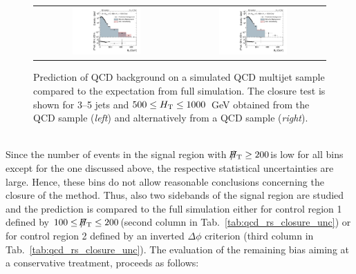 \begin{figure}[!t]
  \centering
  \begin{tabular}{cc}
                \includegraphics[width=0.49\textwidth]{figures/MHT_JetBin2_HTlow_madgraph_DR53X_chs_TuneZ2star_pt10_withoutPUReweighting_UseRebCorrection_v1.pdf} &
                \includegraphics[width=0.49\textwidth]{figures/MHT_JetBin2_HTlow_pythia_DR53X_chs_TuneZ2star_pt10_withoutPUReweighting_UseRebCorrection_v1.pdf}\\
  \end{tabular}
  \caption{Prediction of QCD background on a simulated QCD multijet sample compared to the expectation from full simulation. The closure test is shown for 3--5 jets and $ 500 \leq H_{\text{T}} \leq 1000$~GeV obtained from the \madgraph QCD sample (\textit{left}) and alternatively from a \pythia QCD sample (\textit{right}).}
  \label{fig:qcd_rs_closure_comp}
\end{figure}
\\
Since the number of events in the signal region with $\slash\mkern-12mu{H}_{\text{T}} \ge 200$\gev is low for all bins except for the one discussed above, the respective statistical uncertainties are large. Hence, these bins do not allow reasonable conclusions concerning the closure of the method. Thus, also two sidebands of the signal region are studied and the prediction is compared to the full simulation either for control region 1 defined by $ 100 \leq \slash\mkern-12mu{H}_{\text{T}} \leq 200$\gev (second column in Tab.~\ref{tab:qcd_rs_closure_unc}) or for control region 2 defined by an inverted $\Delta \phi$ criterion (third column in Tab.~\ref{tab:qcd_rs_closure_unc}). The evaluation of the remaining bias aiming at a conservative treatment, proceeds as follows: 
